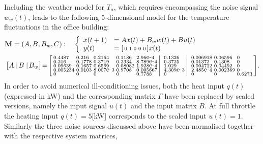 \documentclass[letterpaper, 10 pt, conference]{amsart}
\theoremstyle{definition}
\theoremstyle{example}
\theoremstyle{remark}
\begin{document}
Including the weather model for $T_a$, which requires encompassing the noise signal $w_{w}(t)$, 
leads to the following 5-dimensional model for the temperature fluctuations in the office building:  
\begin{align*}
&\mathbf M=(A,B,B_w,C):\quad\left\{\begin{array}{ll}
x(t+1)&=Ax(t)+B_w w(t)+ Bu(t)\\
y(t)&=\begin{bsmallmatrix}0&1&0&0&0\end{bsmallmatrix}x(t)\end{array}\right.\\
&\begin{bmatrix}A\mid\! B\mid \!B_w\end{bmatrix}\!=\! \left[\begin{smallmatrix*}[l]  
    0.4487 &   0.216 &  0.2164 &  0.1186 & 2.96\mbox{e-}4 \\ 
   0.216 &  0.1778 &  0.3719 &  0.2334 & 8.789\mbox{e-}4 \\ 
 0.09639 &  0.1657 &  0.6569 & 0.08082 & 1.928\mbox{e-}4 \\ 
0.005234 &  0.0103 &8.007\mbox{e-}3 &  0.9708 &0.005667 \\ 
       0 &       0 &       0 &       0 &  0.7788\end{smallmatrix*}\right|\left.\begin{smallmatrix*}[l]  0.1326 \\ 
  0.3725 \\ 
   1.029 \\ 
4.309\mbox{e-}3 \\ 
       0  \end{smallmatrix*}\right|\left.
 \begin{smallmatrix*}[l]0.006918 & 0.06596 &       0 \\ 
 0.01372 &  0.1308 &       0 \\ 
0.004712 & 0.04492 &       0 \\ 
2.485\mbox{e-}4 &0.002369 &       0 \\ 
       0 &       0 &  0.6273
   \end{smallmatrix*}\right]\!.\end{align*}
In order to avoid numerical ill-conditioning issues, 
both the heat input $q(t)$ (expressed in kW) and the corresponding matrix $\Gamma$ have been replaced by scaled versions, 
namely the input signal $u(t)$ and the input matrix $B$. 
At full throttle the heating input $q(t)=5$[kW] corresponds to the scaled input $u(t)=1$. 
Similarly the three noise sources discussed above have been normalised together with the respective system matrices, 
\end{document}
